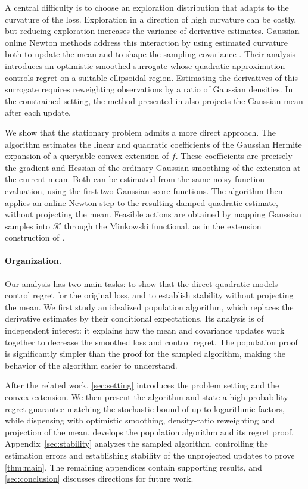 \documentclass[12pt,cleveref]{jmlr}
\newcommand{\K}{\mathcal K}
\newcommand{\1}{\mathbf 1}
\begin{document}
A central difficulty is to choose an exploration distribution that adapts
to the curvature of the loss. Exploration in a direction of high curvature
can be costly, but reducing exploration increases the variance of derivative
estimates. Gaussian online Newton methods address this interaction by using
estimated curvature both to update the mean and to shape the sampling
covariance \citep{lattimore2023second,fokkema2024online}. Their analysis
introduces an optimistic smoothed surrogate whose quadratic approximation
controls regret on a suitable ellipsoidal region. Estimating the derivatives
of this surrogate requires reweighting observations by a ratio of Gaussian
densities. In the constrained setting, the method presented in
\citet[Chapter~10]{lattimore2026bandit} also projects the Gaussian mean after
each update.

We show that the stationary problem admits a more direct approach. The
algorithm estimates the linear and quadratic coefficients of the Gaussian
Hermite expansion of a queryable convex extension of $f$. These coefficients
are precisely the gradient and Hessian of the ordinary Gaussian smoothing
of the extension at the current mean. Both can be estimated from the same
noisy function evaluation, using the first two Gaussian score functions.
The algorithm then applies an online Newton step to the resulting damped
quadratic estimate, without projecting the mean. Feasible actions are
obtained by mapping Gaussian samples into $\K$ through the Minkowski
functional, as in the extension construction of
\citet{fokkema2024online}.

\paragraph{Organization.}
Our analysis has two main tasks: to show that the direct quadratic models
control regret for the original loss, and to establish stability without
projecting the mean. We first study an idealized population algorithm,
which replaces the derivative estimates by their conditional expectations.
Its analysis is of independent interest: it explains how the mean and
covariance updates work together to decrease the smoothed loss and control
regret. The population proof is significantly simpler than the proof for
the sampled algorithm, making the behavior of the algorithm easier to
understand.

After the related work, \cref{sec:setting} introduces the problem setting
and the convex extension. We then present the algorithm and state a
high-probability regret guarantee matching the stochastic bound of
\citet{fokkema2024online} up to logarithmic factors, while dispensing
with optimistic smoothing, density-ratio reweighting and projection
of the mean.  develops the population
algorithm and its regret proof.
Appendix~\ref{sec:stability} analyzes the sampled algorithm, controlling
the estimation errors and establishing stability of the unprojected
updates to prove \cref{thm:main}. The remaining appendices contain
supporting results, and \cref{sec:conclusion} discusses directions for
future work.
\end{document}
